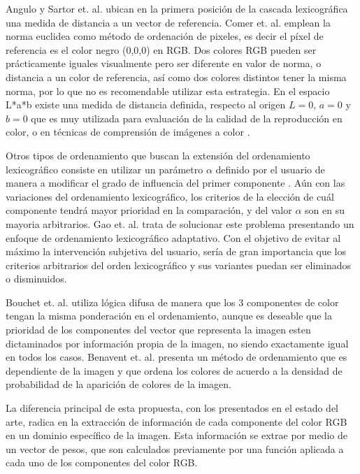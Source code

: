 Angulo \cite{angulo2005morphological} y  Sartor et. al. \cite{sartor2001morphological} ubican en la primera posici\'on de la cascada lexicogr\'afica una medida de distancia a un vector de referencia. Comer et. al. \cite{comer1999morphological} emplean la norma euclidea como método de ordenación de pixeles, es decir el píxel de referencia es el color negro (0,0,0) en RGB. Dos colores RGB pueden ser pr\'acticamente iguales visualmente pero ser diferente en valor de norma, o distancia a un color de referencia, as\'i como dos colores distintos tener la misma norma, por lo que no es recomendable utilizar esta estrategia. En el espacio L*a*b existe una medida de distancia definida, respecto al origen $L=0$, $a=0$ y $b=0$ que es muy utilizada para evaluación de la calidad de la reproducción en color, o en técnicas de comprensión de imágenes a color \cite{tremeau1998analyse}.   

Otros tipos de ordenamiento que buscan la extensi\'on del ordenamiento lexicogr\'afico consiste en utilizar un par\'ametro $\alpha$ definido por el usuario de manera a modificar el grado de influencia del primer componente \cite{ortiz2002procesamiento,angulo2005unified}.  A\'un con las variaciones del ordenamiento lexicogr\'afico, los criterios de la elecci\'on de cu\'al componente tendr\'a mayor prioridad en la comparaci\'on, y del valor $\alpha$ son en su mayoria arbitrarios. Gao et. al. \cite{gao2013adaptive} trata de solucionar este problema presentando  un enfoque de ordenamiento lexicogr\'afico adaptativo. 
Con el objetivo de evitar al m\'aximo la intervenci\'on subjetiva del usuario, ser\'ia de gran
importancia que los criterios arbitrarios del orden lexicogr\'afico y sus variantes puedan ser eliminados o disminuidos.


Bouchet et. al. \cite{bouchet2016fuzzy} utiliza l\'ogica difusa de manera que los 3 componentes de color tengan la misma ponderaci\'on en el ordenamiento, aunque es deseable que la prioridad de los componentes del vector que representa la imagen esten dictaminados por informaci\'on propia de la imagen, no siendo exactamente igual en todos los casos. Benavent et. al. \cite{benavent2012mathematical} presenta un m\'etodo de ordenamiento que es dependiente de la imagen y que ordena los colores de acuerdo a la densidad de probabilidad de la aparici\'on de colores de la imagen. 

La diferencia principal de esta propuesta, con los presentados en el estado del arte, radica en la extracci\'on de informaci\'on de cada componente del color RGB en un dominio espec\'ifico de la imagen. Esta informaci\'on se extrae por medio de un vector de pesos, que son calculados previamente por una funci\'on aplicada a cada uno de los componentes del color RGB. 



